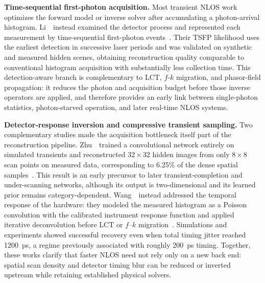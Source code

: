 \vspace{0.8mm}
\noindent \textbf{Time-sequential first-photon acquisition.}
Most transient NLOS work optimizes the forward model or inverse solver after accumulating a photon-arrival histogram. Li~\etal~instead examined the detector process and represented each measurement by time-sequential first-photon events~\cite{liFirstPhotonStamping2022}. Their TSFP likelihood uses the earliest detection in successive laser periods and was validated on synthetic and measured hidden scenes, obtaining reconstruction quality comparable to conventional histogram acquisition with substantially less collection time. This detection-aware branch is complementary to LCT, $f$-$k$ migration, and phasor-field propagation: it reduces the photon and acquisition budget before those inverse operators are applied, and therefore provides an early link between single-photon statistics, photon-starved operation, and later real-time NLOS systems. 


\vspace{0.8mm}
\noindent \textbf{Detector-response inversion and compressive transient sampling.}
Two complementary studies made the acquisition bottleneck itself part of the reconstruction pipeline. Zhu~\etal~trained a convolutional network entirely on simulated transients and reconstructed $32\times32$ hidden images from only $8\times8$ scan points on measured data, corresponding to 6.25\% of the dense spatial samples~\cite{zhuCompressiveNLOSDeepLearning2023}. This result is an early precursor to later transient-completion and under-scanning networks, although its output is two-dimensional and its learned prior remains category-dependent. Wang~\etal~instead addressed the temporal response of the hardware: they modeled the measured histogram as a Poisson convolution with the calibrated instrument response function and applied iterative deconvolution before LCT or $f$--$k$ migration~\cite{wangIRFDeconvolutionNLOS2024}. Simulations and experiments showed successful recovery even when total timing jitter reached 1200~ps, a regime previously associated with roughly 200~ps timing. Together, these works clarify that faster NLOS need not rely only on a new back end: spatial scan density and detector timing blur can be reduced or inverted upstream while retaining established physical solvers.

